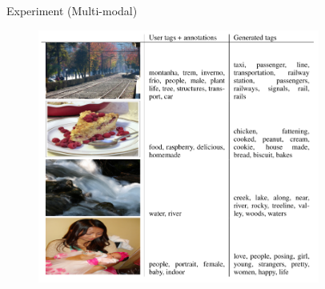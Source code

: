 \documentclass[10pt]{beamer}
\begin{document}
	\begin{frame}{Experiment (Multi-modal)}
		\begin{figure}
			\includegraphics[width=25em]{figures/CGAN-experiment-multi-modal.png}
		\end{figure}
	\end{frame}
	
\end{document}
